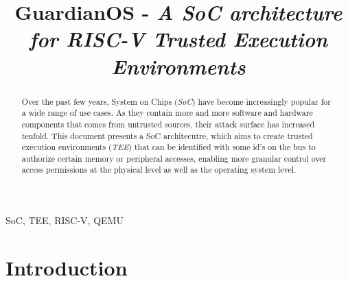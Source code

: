 \documentclass[conference]{IEEEtran}
\begin{document}
\title{GuardianOS - \textit{A SoC architecture for RISC-V Trusted Execution Environments} \\
{\footnotesize \textsuperscript{}}
}

\author{
\and
{}
}


\maketitle

\begin{abstract}
Over the past few years, System on Chips (\textit{SoC}) have become increasingly popular for a wide range of use cases. As they contain more and more software and hardware components that comes from untrusted sources, their attack surface has increased tenfold. This document presents a SoC architecutre, which aims to create trusted execution environments (\textit{TEE}) that can be identified with some id's on the bus to authorize certain memory or peripheral accesses, enabling more granular control over access permissions at the physical level as well as the operating system level.\\[1cm]

\end{abstract}

\begin{IEEEkeywords}
SoC, TEE, RISC-V, QEMU
\end{IEEEkeywords}

\section{Introduction}
\end{document}
